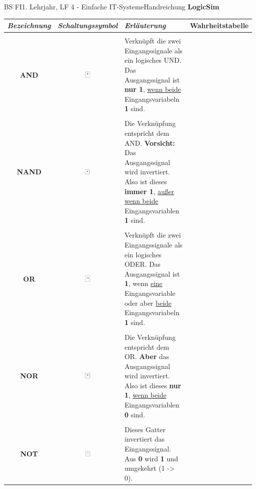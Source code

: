 \documentclass[11pt,oneside,openany,headings=optiontotoc,11pt,numbers=noenddot]{article}
\begin{document}
\begin{worksheet}{BS FI}{1. Lehrjahr, LF 4 - Einfache IT-Systeme}{Handreichung \textbf{LogicSim}}
\begin{tabularx}{\textwidth}{c|c|X|c}
			\textit{Bezeichnung} & \textit{Schaltungssymbol} & \textit{Erläuterung} & Wahrheitstabelle\\
			\hline
			\hline
			& & & \\
			\textbf{AND} & \includegraphics[width=0.1\textwidth, align=t]{../99_Bilder/AND.jpg} & Verknüpft die zwei Eingangssignale als ein logisches UND. Das Ausgangssignal ist \textbf{nur 1}, \underline{wenn beide} Eingangsvariabeln \textbf{1} sind. & \\
			\hline
			& & & \\
			\textbf{NAND} & \includegraphics[width=0.1\textwidth,align=t]{../99_Bilder/NAND.jpg} & Die Verknüpfung entspricht dem AND. \textbf{Vorsicht:} Das Ausgangssignal wird invertiert. Also ist dieses \textbf{immer 1}, \underline{außer wenn beide} Eingangsvariablen \textbf{1} sind. & \\
			\hline
			& & & \\
			\textbf{OR} & \includegraphics[width=0.1\textwidth, align=t]{../99_Bilder/OR.jpg} & Verknüpft die zwei Eingangssignale als ein logisches ODER. Das Ausgangssignal ist \textbf{1}, wenn \underline{eine} Eingangsvariable oder aber \underline{beide} Eingangsvariabeln \textbf{1} sind. & \\
			\hline
			& & & \\
			\textbf{NOR} & \includegraphics[width=0.1\textwidth,align=t]{../99_Bilder/NOR.jpg} & Die Verknüpfung entspricht dem OR. \textbf{Aber} das Ausgangssignal wird invertiert. Also ist dieses  \textbf{nur 1}, \underline{wenn beide} Eingangsvariablen \textbf{0} sind. & \\
			\hline
			& & & \\
			\textbf{NOT} & \includegraphics[width=0.1\textwidth, align=t]{../99_Bilder/NOT.jpg} & Dieses Gatter invertiert das Eingangssignal. Aus \textbf{0} wird \textbf{1} und umgekehrt (1 -> 0). & \\

\end{tabularx}
\end{worksheet}
\end{document}
